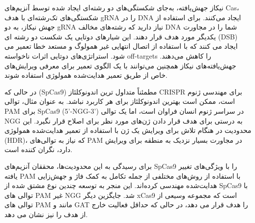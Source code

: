 \documentclass[12pt,a4paper,BCOR=.7cm,headsepline,bibliography=totoc]{report}
\begin{document}
نیکاز  جهش‌یافته‌، به‌جای شکستگی‌های دو رشته‌ای ایجاد شده توسط آنزیم‌های Cas، شکستگی‌های تک‌رشته‌ای با هدف gRNA را در DNA ایجاد می‌کنند. برای استفاده از جهش نیکاز، به دو gRNA نیاز دارید که رشته‌های مخالف DNA شما را در مجاورت یکدیگر مورد هدف قرار دهند. این شیارهای دوتایی یک شکست دو رشته ای (DSB) ایجاد می کنند که با استفاده از اتصال انتهایی غیر همولوگ  و مستعد خطا تعمیر می شود. استراتژی‌های دوتایی اثرات ناخواسته off-targets را کاهش می‌دهند. جهش‌یافته‌های نیکاز همچنین می‌توانند با یک الگوی تعمیر برای معرفی ویرایش‌های خاص از طریق تعمیر هدایت‌شده همولوژی  استفاده شوند.

در حالی که  (SpCas9) مطمئناً متداول ترین اندونوکلئاز CRISPR برای مهندسی ژنوم است، ممکن است بهترین اندونوکلئاز برای هر کاربرد نباشد. به عنوان مثال، توالی PAM برای SpCas9 (5'-NGG-3') در سراسر ژنوم انسان فراوان است، اما یک توالی NGG به درستی برای هدف قرار دادن ژن‌های مورد نظر برای اصلاح قرار نگیرد. این محدودیت در هنگام تلاش برای ویرایش یک ژن با استفاده از تعمیر هدایت‌شده همولوژی (HDR)، که نیاز به توالی‌های PAM در مجاورت بسیار نزدیک به منطقه برای ویرایش دارد، نگران کننده است.

برای رسیدگی به این محدودیت‌ها، محققان آنزیم‌های SpCas9 را با ویژگی‌های تغییر یافته PAM با استفاده از روش‌های مختلفی از جمله تکامل به کمک فاژ و جهش‌زایی هدایت‌شده مهندسی کرده‌اند. این منجر به توسعه چندین نوع مشتق شده از SpCas9 با توالی های PAM غیر NGG شد. جایگزین دیگر   xCas9 است که مجموعه وسیعی از توالی های PAM مانند  و GAT را هدف قرار می دهد، در حالی که حداقل فعالیت خارج از هدف را نیز نشان می دهد.
\end{document}
